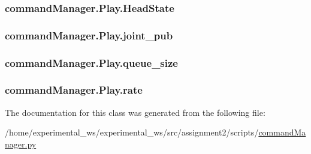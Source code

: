 \subsubsection[{\texorpdfstring{Head\+State}{HeadState}}]{\setlength{\rightskip}{0pt plus 5cm}command\+Manager.\+Play.\+Head\+State\hspace{0.3cm}{\ttfamily [static]}}\hypertarget{classcommandManager_1_1Play_a9fbbdb1ce8c11f60a9be52e5b76b8af7}{}\label{classcommandManager_1_1Play_a9fbbdb1ce8c11f60a9be52e5b76b8af7}
\subsubsection[{\texorpdfstring{joint\+\_\+pub}{joint_pub}}]{\setlength{\rightskip}{0pt plus 5cm}command\+Manager.\+Play.\+joint\+\_\+pub\hspace{0.3cm}{\ttfamily [static]}}\hypertarget{classcommandManager_1_1Play_a0318d05c9cb612980001166e0a5e6db3}{}\label{classcommandManager_1_1Play_a0318d05c9cb612980001166e0a5e6db3}
\subsubsection[{\texorpdfstring{queue\+\_\+size}{queue_size}}]{\setlength{\rightskip}{0pt plus 5cm}command\+Manager.\+Play.\+queue\+\_\+size\hspace{0.3cm}{\ttfamily [static]}}\hypertarget{classcommandManager_1_1Play_a228538235f3ed04c9ac82f4cfcf1cf1d}{}\label{classcommandManager_1_1Play_a228538235f3ed04c9ac82f4cfcf1cf1d}
\subsubsection[{\texorpdfstring{rate}{rate}}]{\setlength{\rightskip}{0pt plus 5cm}command\+Manager.\+Play.\+rate}\hypertarget{classcommandManager_1_1Play_a34aba8df5dfec3560f194934b7e377ad}{}\label{classcommandManager_1_1Play_a34aba8df5dfec3560f194934b7e377ad}


The documentation for this class was generated from the following file\+:\begin{DoxyCompactItemize}
\item 
/home/experimental\+\_\+ws/experimental\+\_\+ws/src/assignment2/scripts/\hyperlink{commandManager_8py}{command\+Manager.\+py}\end{DoxyCompactItemize}
